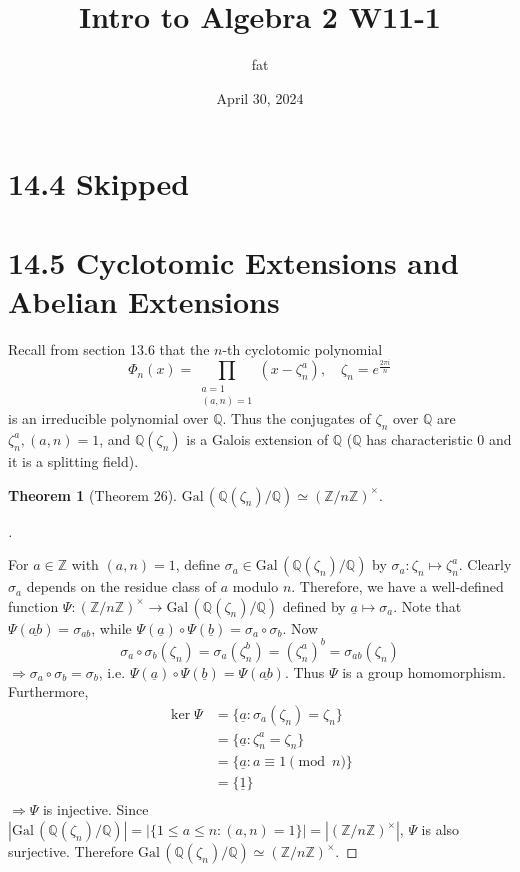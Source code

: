 \documentclass{article}
\title{Intro to Algebra 2 W11-1}
\author{fat}
\date{April 30, 2024}
\theoremstyle{definition}
\newtheorem{thm}{Theorem}
\newenvironment{proofs}[1][\proofname]{%
  \begin{proof}[#1]$ $\par\nobreak\ignorespaces
}{%
  \end{proof}
}
\newcommand{\QQ}{\mathbb Q}
\newcommand{\ZZ}{\mathbb Z}
\newcommand{\Ra}{\Rightarrow}
\newcommand{\Gal}{\text{Gal}\,}
\begin{document}
\maketitle
\thispagestyle{fancy}
\renewcommand{\footrulewidth}{0.4pt}
\cfoot{\thepage}
\renewcommand{\headrulewidth}{0.4pt}

\section*{14.4 Skipped}

\section*{14.5 Cyclotomic Extensions and Abelian Extensions}

Recall from section 13.6 that the $n$-th cyclotomic polynomial
\[
	\Phi_n(x) = \prod_{\substack{a = 1 \\ (a, n) = 1}} (x - \zeta_n^a), \quad \zeta_n = e^{\frac{2 \pi i}{n}}
\]
is an irreducible polynomial over $\QQ$.
Thus the conjugates of $\zeta_n$ over $\QQ$ are $\zeta_n^a, (a, n) = 1$, and $\QQ(\zeta_n)$ is a Galois extension of $\QQ$ ($\QQ$ has characteristic 0 and it is a splitting field).

\begin{thm}[Theorem 26]
	$\Gal(\QQ(\zeta_n)/\QQ) \simeq (\ZZ/n \ZZ)^\times$.
\end{thm}

\begin{proofs}
	For $a \in \ZZ$ with $(a, n) = 1$, define $\sigma_a \in \Gal(\QQ(\zeta_n)/\QQ)$ by $\sigma_a: \zeta_n \mapsto \zeta_n^a$.
	Clearly $\sigma_a$ depends on the residue class of $a$ modulo $n$.
	Therefore, we have a well-defined function $\Psi: (\ZZ/n \ZZ)^\times \to \Gal(\QQ(\zeta_n)/\QQ)$ defined by $\underline{a} \mapsto \sigma_a$.
	Note that $\Psi(\underline{ab}) = \sigma_{ab}$, while $\Psi(\underline{a}) \circ \Psi(\underline{b}) = \sigma_a \circ \sigma_b$.
	Now 
	\[
		\sigma_a \circ \sigma_b(\zeta_n) = \sigma_a ( \zeta_n^b) = (\zeta_n^a)^b = \sigma_{ab}(\zeta_n)
	\]
	$\Ra \sigma_a \circ \sigma_b = \sigma_{b}$, i.e. $\Psi(\underline{a}) \circ \Psi(\underline{b}) = \Psi(\underline{ab})$.
	Thus $\Psi$ is a group homomorphism.
	Furthermore, 
	\[
		\begin{split}
			\ker \Psi &= \{ \underline{a} : \sigma_a(\zeta_n) = \zeta_n\}\\
			&= \{\underline{a}: \zeta_n^a = \zeta_n\}\\
			&= \{\underline{a}: a \equiv 1 \pmod{n}\}\\
			&= \{\underline{1}\}\\
		\end{split}
	\]
	$\Ra \Psi$ is injective.
	Since $|\Gal(\QQ(\zeta_n)/\QQ)| = |\{1 \leq a \leq n: (a, n) = 1\}| = |(\ZZ/n \ZZ)^\times|$, $\Psi$ is also surjective. 
	Therefore $\Gal(\QQ(\zeta_n)/\QQ) \simeq (\ZZ/n \ZZ)^\times$.
\end{proofs}
\end{document}
